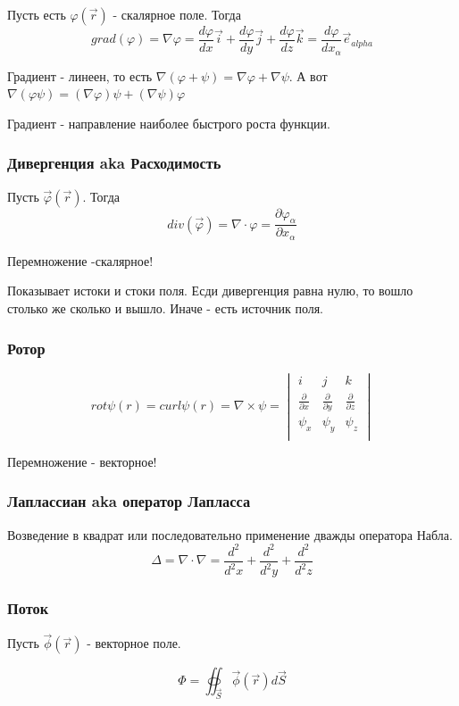 \documentclass{article}
\begin{document}
Пусть есть $\varphi(\vec r)$ - скалярное поле. Тогда $$grad(\varphi) = \nabla \varphi = \frac{d\varphi}{dx}\vec i + \frac{d\varphi}{dy}\vec j +\frac{d\varphi}{dz}\vec k = \frac{d\varphi}{dx_{\alpha}}\vec e_{alpha}$$

Градиент - линеен, то есть $\nabla(\varphi + \psi) = \nabla \varphi + \nabla \psi$. А вот $\nabla (\varphi\psi) = (\nabla \varphi)\psi + (\nabla \psi)\varphi$

Градиент - направление наиболее быстрого роста функции. 

\subsubsection{Дивергенция aka Расходимость}
Пусть $\vec \varphi(\vec r)$. Тогда
$$div (\vec \varphi) = \nabla\cdot\varphi = \frac{\partial \varphi_{\alpha}}{\partial x_{\alpha}}$$

Перемножение -скалярное!

Показывает истоки и стоки поля. Есди дивергенция равна нулю, то вошло столько же сколько и вышло. Иначе - есть источник поля.

\subsubsection{Ротор}
$$rot \psi(r) = curl \psi(r) = \nabla\times\psi = \begin{vmatrix}
	i & j & k\\
	\frac{\partial}{\partial x} & \frac{\partial}{\partial y} & \frac{\partial}{\partial z}\\
	\psi_x & \psi_y & \psi_z\\
\end{vmatrix}
$$

Перемножение - векторное!

\subsubsection{Лаплассиан aka оператор Лапласса}
Возведение в квадрат или последовательно применение дважды оператора Набла.
$$\Delta = \nabla\cdot\nabla = \frac{d^2}{d^2x}+ \frac{d^2}{d^2y} +\frac{d^2}{d^2z} $$

\subsubsection{Поток}

Пусть $\vec \phi(\vec r)$ - векторное поле.
 
 $$\Phi = \oiint_{\vec S}\vec \phi(\vec r)d\vec S$$
\end{document}
